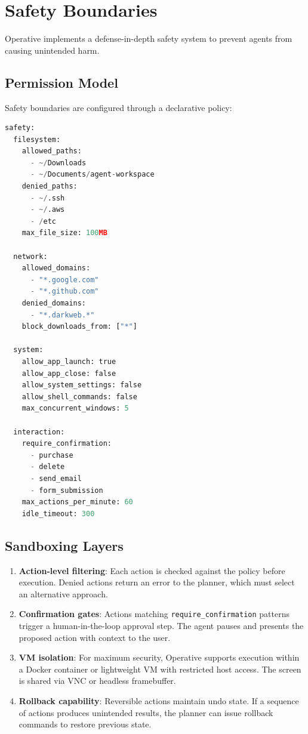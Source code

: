 \documentclass[11pt,twocolumn]{article}
\begin{document}
\section{Safety Boundaries}
\label{sec:safety}

Operative implements a defense-in-depth safety system to prevent agents from causing unintended harm.

\subsection{Permission Model}

Safety boundaries are configured through a declarative policy:

\begin{lstlisting}[language=Python, caption=Safety boundary configuration]
safety:
  filesystem:
    allowed_paths:
      - ~/Downloads
      - ~/Documents/agent-workspace
    denied_paths:
      - ~/.ssh
      - ~/.aws
      - /etc
    max_file_size: 100MB

  network:
    allowed_domains:
      - "*.google.com"
      - "*.github.com"
    denied_domains:
      - "*.darkweb.*"
    block_downloads_from: ["*"]

  system:
    allow_app_launch: true
    allow_app_close: false
    allow_system_settings: false
    allow_shell_commands: false
    max_concurrent_windows: 5

  interaction:
    require_confirmation:
      - purchase
      - delete
      - send_email
      - form_submission
    max_actions_per_minute: 60
    idle_timeout: 300
\end{lstlisting}

\subsection{Sandboxing Layers}

\begin{enumerate}[leftmargin=*]
    \item \textbf{Action-level filtering}: Each action is checked against the policy before execution. Denied actions return an error to the planner, which must select an alternative approach.
    \item \textbf{Confirmation gates}: Actions matching \texttt{require\_confirmation} patterns trigger a human-in-the-loop approval step. The agent pauses and presents the proposed action with context to the user.
    \item \textbf{VM isolation}: For maximum security, Operative supports execution within a Docker container or lightweight VM with restricted host access. The screen is shared via VNC or headless framebuffer.
    \item \textbf{Rollback capability}: Reversible actions maintain undo state. If a sequence of actions produces unintended results, the planner can issue rollback commands to restore previous state.
\end{enumerate}
\end{document}

